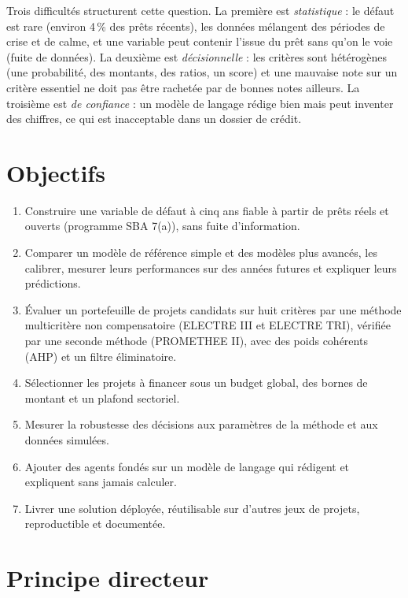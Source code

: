 Trois difficultés structurent cette question. La première est \emph{statistique} : le défaut est rare (environ 4\,\%
des prêts récents), les données mélangent des périodes de crise et de calme, et une variable peut contenir l'issue
du prêt sans qu'on le voie (fuite de données). La deuxième est \emph{décisionnelle} : les critères sont hétérogènes
(une probabilité, des montants, des ratios, un score) et une mauvaise note sur un critère essentiel ne doit pas être
rachetée par de bonnes notes ailleurs. La troisième est \emph{de confiance} : un modèle de langage rédige bien mais
peut inventer des chiffres, ce qui est inacceptable dans un dossier de crédit.

\section{Objectifs}

\begin{enumerate}
  \item Construire une variable de défaut à cinq ans fiable à partir de prêts réels et ouverts (programme SBA 7(a)),
        sans fuite d'information.
  \item Comparer un modèle de référence simple et des modèles plus avancés, les calibrer, mesurer leurs
        performances sur des années futures et expliquer leurs prédictions.
  \item Évaluer un portefeuille de projets candidats sur huit critères par une méthode multicritère non
        compensatoire (ELECTRE III et ELECTRE TRI), vérifiée par une seconde méthode (PROMETHEE II), avec des poids
        cohérents (AHP) et un filtre éliminatoire.
  \item Sélectionner les projets à financer sous un budget global, des bornes de montant et un plafond sectoriel.
  \item Mesurer la robustesse des décisions aux paramètres de la méthode et aux données simulées.
  \item Ajouter des agents fondés sur un modèle de langage qui rédigent et expliquent sans jamais calculer.
  \item Livrer une solution déployée, réutilisable sur d'autres jeux de projets, reproductible et documentée.
\end{enumerate}

\section{Principe directeur}

